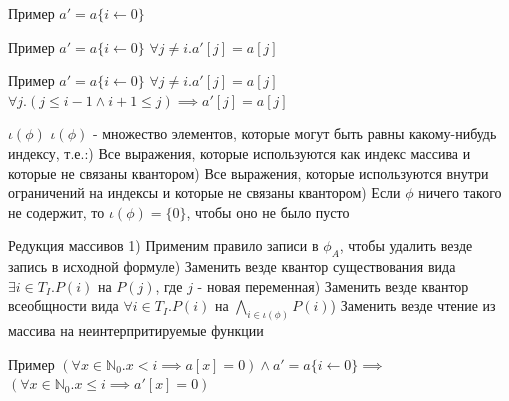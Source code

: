 \documentclass{beamer}
\begin{document}
\begin{frame}{Пример}
$a' = a\{i\leftarrow 0\}$\newline
\end{frame}

\begin{frame}{Пример}
$a' = a\{i\leftarrow 0\}$\newline
$\forall j \ne i. a'[j] = a[j]$\newline
\end{frame}

\begin{frame}{Пример}
$a' = a\{i\leftarrow 0\}$\newline
$\forall j \ne i. a'[j] = a[j]$\newline
$\forall j. (j \le i - 1 \wedge i + 1 \le j) \implies a'[j] = a[j]$
\end{frame}

\begin{frame}{$\iota(\phi)$}
$\iota(\phi)$ - множество элементов, которые могут быть равны какому-нибудь индексу, т.е.:) Все выражения, которые используются как индекс массива и которые не связаны квантором) Все выражения, которые используются внутри ограничений на индексы и которые не связаны квантором) Если $\phi$ ничего такого не содержит, то $\iota(\phi) = \{0\}$, чтобы оно не было пусто\newline
\end{frame}

\begin{frame}{Редукция массивов}
1) Применим правило записи в $\phi_A$, чтобы удалить везде запись в исходной формуле) Заменить везде квантор существования вида $\exists i \in T_I. P(i)$ на $P(j)$, где $j$ - новая переменная) Заменить везде квантор всеобщности вида $\forall i \in T_I. P(i)$ на $\bigwedge_{i \in \iota(\phi)}P(i)$) Заменить везде чтение из массива на неинтерпритируемые функции
\end{frame}

\begin{frame}{Пример}
$(\forall x \in \mathbb{N}_0. x < i \implies a[x] = 0) \wedge a' = a\{i\leftarrow 0\} \implies$\newline
$(\forall x \in \mathbb{N}_0. x \le i \implies a'[x] = 0)$
\end{frame}
\end{document}
